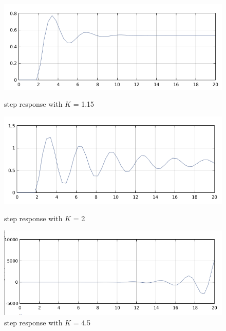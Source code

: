 \message{ !name(lab1.tex)}\documentclass[a4paper,12pt,openany]{book}
\begin{document}
 \begin{figure}[H]
   \includegraphics[width = 165mm, scale = 0.85]{lab03part2a2.png}
   \caption{step response with $K$ = 1.15}
   \includegraphics[width = 165mm, scale = 0.85]{lab03part2a3.png}
   \caption{step response with $K$ = 2}
   \includegraphics[width = 165mm, scale = 0.85]{lab03part2a4.png}
   \caption{step response with $K$ = 4.5}
 \end{figure}
\end{document}
